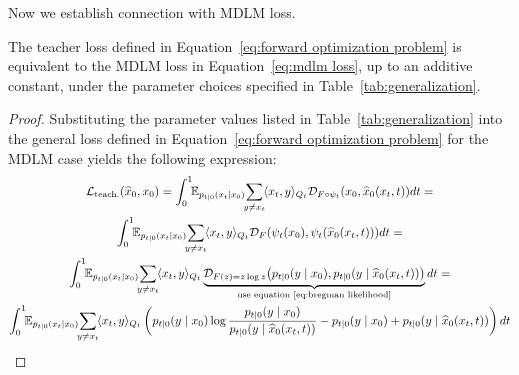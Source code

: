         Now we establish connection with MDLM loss.
        \begin{proposition}
            The teacher loss defined in Equation~\eqref{eq:forward optimization problem} is equivalent to the MDLM loss in Equation~\eqref{eq:mdlm loss}, up to an additive constant, under the parameter choices specified in Table~\ref{tab:generalization}. 
        \end{proposition}
        \begin{proof}
            Substituting the parameter values listed in Table~\ref{tab:generalization} into the general loss defined in Equation~\eqref{eq:forward optimization problem} for the MDLM case yields the following expression:
            \begin{gather}
                \LC_{\text{teach.}}(\widehat{x}_0, x_0) = \int_0^1 \!\! \EE_{p_{t|0}(x_t|x_0)} \!\! \sum_{y \neq x_t}\!  \langle x_t, y\rangle_{Q_t} \DC_{F\circ\psi_t}\!\left(x_0, \widehat{x}_0(x_t, t)\right) \!dt = 
                \nonumber\\
                \int_0^1 \!\! \EE_{p_{t|0}(x_t|x_0)} \!\! \sum_{y \neq x_t}\!  \langle x_t, y\rangle_{Q_t} \DC_{F}\!\left(\psi_t(x_0), \psi_t(\widehat{x}_0(x_t, t)\right)) dt = 
                \nonumber\\
                \int_0^1 \!\! \EE_{p_{t|0}(x_t|x_0)} \!\! \sum_{y \neq x_t}\!  \langle x_t, y\rangle_{Q_t} \underbrace{\DC_{F(z) = z\log z}\!\left(p_{t\mid 0}(y\mid x_0), p_{t\mid 0}(y\mid \widehat{x}_0 (x_t, t))\right)}_{\text{use equation~\eqref{eq:bregman likelihood}}} dt = 
                \nonumber\\
                \int_0^1 \!\! \EE_{p_{t|0}(x_t|x_0)} \!\! \sum_{y \neq x_t}\!  \langle x_t, y\rangle_{Q_t} \left( p_{t\mid 0}(y\mid x_0) \log \frac{p_{t\mid 0}(y\mid x_0)}{p_{t\mid 0}(y\mid \widehat{x}_0 (x_t, t))} - p_{t\mid 0}(y\mid x_0) + p_{t\mid 0}(y\mid \widehat{x}_0 (x_t, t))\right) dt 
            \end{gather}
        \end{proof}
